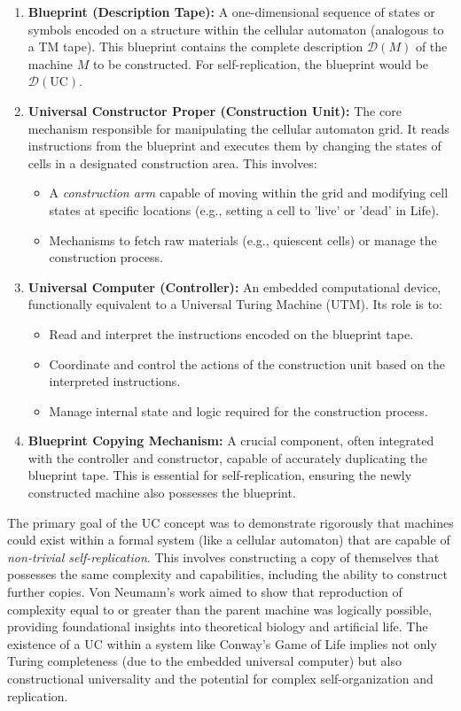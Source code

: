 \documentclass{article}
\theoremstyle{definition}
\theoremstyle{plain}
\theoremstyle{plain}
\begin{document}
\begin{enumerate}
  \item \textbf{Blueprint (Description Tape):} A one-dimensional sequence of states or symbols encoded on a structure within the cellular automaton (analogous to a TM tape). This blueprint contains the complete description $\mathcal{D}(M)$ of the machine $M$ to be constructed. For self-replication, the blueprint would be $\mathcal{D}(\text{UC})$.

  \item \textbf{Universal Constructor Proper (Construction Unit):} The core mechanism responsible for manipulating the cellular automaton grid. It reads instructions from the blueprint and executes them by changing the states of cells in a designated construction area. This involves:
    \begin{itemize}
      \item A \textit{construction arm} capable of moving within the grid and modifying cell states at specific locations (e.g., setting a cell to 'live' or 'dead' in Life).
      \item Mechanisms to fetch raw materials (e.g., quiescent cells) or manage the construction process.
    \end{itemize}

  \item \textbf{Universal Computer (Controller):} An embedded computational device, functionally equivalent to a Universal Turing Machine (UTM). Its role is to:
    \begin{itemize}
      \item Read and interpret the instructions encoded on the blueprint tape.
      \item Coordinate and control the actions of the construction unit based on the interpreted instructions.
      \item Manage internal state and logic required for the construction process.
    \end{itemize}

  \item \textbf{Blueprint Copying Mechanism:} A crucial component, often integrated with the controller and constructor, capable of accurately duplicating the blueprint tape. This is essential for self-replication, ensuring the newly constructed machine also possesses the blueprint.
\end{enumerate}

The primary goal of the UC concept was to demonstrate rigorously that machines could exist within a formal system (like a cellular automaton) that are capable of \textit{non-trivial self-replication}. This involves constructing a copy of themselves that possesses the same complexity and capabilities, including the ability to construct further copies. Von Neumann's work aimed to show that reproduction of complexity equal to or greater than the parent machine was logically possible, providing foundational insights into theoretical biology and artificial life. The existence of a UC within a system like Conway's Game of Life implies not only Turing completeness (due to the embedded universal computer) but also constructional universality and the potential for complex self-organization and replication.
\end{document}
